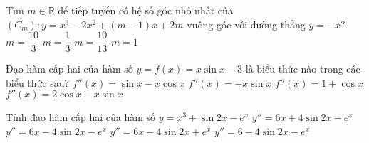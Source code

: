 \begin{ex}
Tìm $m\in \mathbb{R}$ để tiếp tuyến có hệ số góc nhỏ nhất của $\left(C_m\right) \colon y=x^3-2x^2+(m-1)x+2m$ vuông góc với đường thẳng $y=-x$?
\choice
{$m=\dfrac{10}{3}$}
{$m=\dfrac{1}{3}$}
{$m=\dfrac{10}{13}$}
{$m=1$}
\end{ex}
\begin{ex}
Đạo hàm cấp hai của hàm số $y=f(x)=x\sin x-3$ là biểu thức nào trong các biểu thức sau?
\choice
{$f''(x)=\sin x-x\cos x$}
{$f''(x)=-x\sin x$}
{$f''(x)=1+\cos x$}
{$f''(x)=2\cos x-x\sin x$}
\end{ex}
\begin{ex}
Tính đạo hàm cấp hai của hàm số $y=x^3+\sin 2x-e^x$
\choice
{$y''=6x+4\sin 2x-e^x$}
{$y''=6x-4\sin 2x-e^x$}
{$y''=6x-4\sin 2x+e^x$}
{$y''=6-4\sin 2x-e^x$}
\end{ex}


